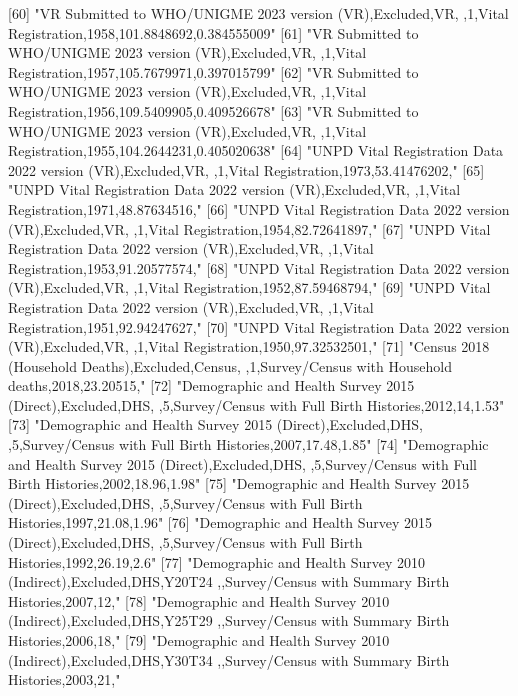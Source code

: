  [60] "VR Submitted to WHO/UNIGME 2023 version (VR),Excluded,VR, ,1,Vital Registration,1958,101.8848692,0.384555009"                 
 [61] "VR Submitted to WHO/UNIGME 2023 version (VR),Excluded,VR, ,1,Vital Registration,1957,105.7679971,0.397015799"                 
 [62] "VR Submitted to WHO/UNIGME 2023 version (VR),Excluded,VR, ,1,Vital Registration,1956,109.5409905,0.409526678"                 
 [63] "VR Submitted to WHO/UNIGME 2023 version (VR),Excluded,VR, ,1,Vital Registration,1955,104.2644231,0.405020638"                 
 [64] "UNPD Vital Registration Data 2022 version (VR),Excluded,VR, ,1,Vital Registration,1973,53.41476202,"                          
 [65] "UNPD Vital Registration Data 2022 version (VR),Excluded,VR, ,1,Vital Registration,1971,48.87634516,"                          
 [66] "UNPD Vital Registration Data 2022 version (VR),Excluded,VR, ,1,Vital Registration,1954,82.72641897,"                          
 [67] "UNPD Vital Registration Data 2022 version (VR),Excluded,VR, ,1,Vital Registration,1953,91.20577574,"                          
 [68] "UNPD Vital Registration Data 2022 version (VR),Excluded,VR, ,1,Vital Registration,1952,87.59468794,"                          
 [69] "UNPD Vital Registration Data 2022 version (VR),Excluded,VR, ,1,Vital Registration,1951,92.94247627,"                          
 [70] "UNPD Vital Registration Data 2022 version (VR),Excluded,VR, ,1,Vital Registration,1950,97.32532501,"                          
 [71] "Census 2018 (Household Deaths),Excluded,Census, ,1,Survey/Census with Household deaths,2018,23.20515,"                        
 [72] "Demographic and Health Survey 2015 (Direct),Excluded,DHS, ,5,Survey/Census with Full Birth Histories,2012,14,1.53"            
 [73] "Demographic and Health Survey 2015 (Direct),Excluded,DHS, ,5,Survey/Census with Full Birth Histories,2007,17.48,1.85"         
 [74] "Demographic and Health Survey 2015 (Direct),Excluded,DHS, ,5,Survey/Census with Full Birth Histories,2002,18.96,1.98"         
 [75] "Demographic and Health Survey 2015 (Direct),Excluded,DHS, ,5,Survey/Census with Full Birth Histories,1997,21.08,1.96"         
 [76] "Demographic and Health Survey 2015 (Direct),Excluded,DHS, ,5,Survey/Census with Full Birth Histories,1992,26.19,2.6"          
 [77] "Demographic and Health Survey 2010 (Indirect),Excluded,DHS,Y20T24 ,,Survey/Census with Summary Birth Histories,2007,12,"      
 [78] "Demographic and Health Survey 2010 (Indirect),Excluded,DHS,Y25T29 ,,Survey/Census with Summary Birth Histories,2006,18,"      
 [79] "Demographic and Health Survey 2010 (Indirect),Excluded,DHS,Y30T34 ,,Survey/Census with Summary Birth Histories,2003,21,"      
